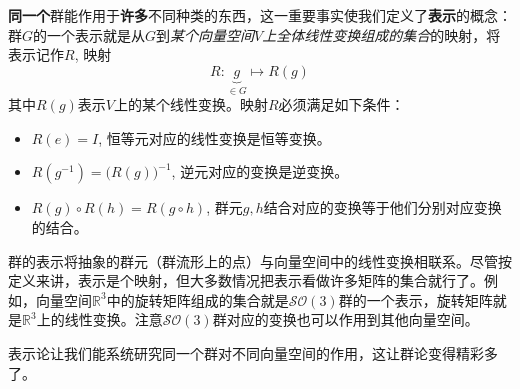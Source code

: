 {\bf 同一个}群能作用于{\bf 许多}不同种类的东西，这一重要事实使我们定义了{\bf 表示}的概念：群$G$的一个表示就是从$G$到{\it 某个向量空间$V$上全体线性变换组成的集合}的映射，将表示记作$R$, 映射
\begin{equation}
\label{equ3.86}
R: \underbrace{g}_{\in G} \mapsto R(g)
\end{equation}
其中$R(g)$表示$V$上的某个线性变换。映射$R$必须满足如下条件：
\begin{itemize}
	\item $R(e) = I$, 恒等元对应的线性变换是恒等变换。
	\item $R(g^{-1}) = \big( R(g) \big)^{-1}$, 逆元对应的变换是逆变换。
	\item $R(g) \circ R(h) = R(g \circ h)$, 群元$g,h$结合对应的变换等于他们分别对应变换的结合。
\end{itemize}

群的表示将抽象的群元（群流形上的点）与向量空间中的线性变换相联系。尽管按定义来讲，表示是个映射，但大多数情况把表示看做许多矩阵的集合就行了。例如，向量空间$\mathbb{R}^3$中的旋转矩阵组成的集合就是$\mathcal{SO}(3)$群的一个表示，旋转矩阵就是$\mathbb{R}^3$上的线性变换。注意$\mathcal{SO}(3)$群对应的变换也可以作用到其他向量空间。

表示论让我们能系统研究同一个群对不同向量空间的作用，这让群论变得精彩多了。

